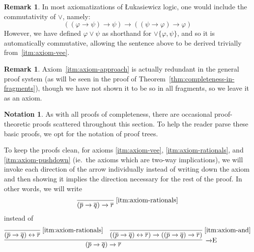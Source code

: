 \documentclass{amsart}
\theoremstyle{definition}
\newtheorem{remark}[theorem]{Remark}
\newtheorem{notation}[theorem]{Notation}
\numberwithin{equation}{theorem}
\renewcommand{\phi}{\varphi}
\newcommand{\unvee}{{\vee}}
\newcommand{\rat}[1]{{\overline{#1}}}
\newcommand{\narrow}[1]{\xrightarrow{#1}}
\renewcommand{\to}{\narrow{}}
\newcommand{\arr}{{\to}}
\newcommand{\elim}{\!\operatorname{E}}
\newcommand{\aref}[1]{\!\text{\ref{itm:axiom-#1}}}
\begin{document}
\begin{remark}\label{rem:auto-commutive}
  In most axiomatizations of {\L}ukasiewicz logic, one would include the commutativity of $\vee$, namely:
  \[
    ((\phi\to\psi)\to\psi)\to((\psi\to\phi)\to\phi)
  \]
  However, we have defined $\phi\vee\psi$ as shorthand for $\unvee\{\phi,\psi\}$, and so it is automatically commutative, allowing the sentence above to be derived trivially from~\ref{itm:axiom-vee}.
\end{remark}
\begin{remark}
  Axiom~\ref{itm:axiom-approach} is actually redundant in the general proof system (as will be seen in the proof of Theorem~\ref{thm:completeness-in-fragments}), though we have not shown it to be so in all fragments, so we leave it as an axiom.
\end{remark}
\begin{notation}
	As with all proofs of completeness, there are occasional proof-theoretic proofs scattered throughout this section. 
	To help the reader parse these basic proofs, we opt for the notation of proof trees.
	
	To keep the proofs clean, for axioms \ref{itm:axiom-vee}, \ref{itm:axiom-rationals}, and \ref{itm:axiom-pushdown} (ie.\ the axioms which are two-way implications), we will invoke each direction of the arrow individually instead of writing down the axiom and then showing it implies the direction necessary for the rest of the proof.
	In other words, we will write
	\[
	  \infer[\aref{rationals}]{(\rat p\to\rat q)\to\rat r}{}
	\]
	instead of
	\[
	  \infer[\arr\elim]{(\rat p\to\rat q)\to\rat r}{
	    \infer[\aref{rationals}]{(\rat p\to\rat q)\leftrightarrow\rat r}{} &
	    \infer[\aref{and}]{((\rat p\to\rat q)\leftrightarrow\rat r)\to((\rat p\to\rat q)\to\rat r)}{}
	  }
	\]
\end{notation}
\end{document}
